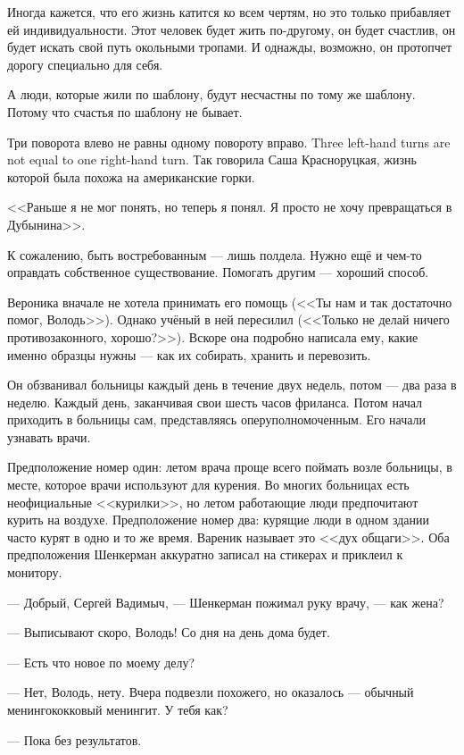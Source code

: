 Иногда кажется, что его жизнь катится ко всем чертям, но это только прибавляет ей индивидуальности.
Этот человек будет жить по-другому, он будет счастлив, он будет искать свой путь окольными тропами.
И однажды, возможно, он протопчет дорогу специально для себя.

А люди, которые жили по шаблону, будут несчастны по тому же шаблону.
Потому что счастья по шаблону не бывает.

{Три поворота влево не равны одному повороту вправо.}
{Three left-hand turns are not equal to one right-hand turn.}
Так говорила Саша Красноруцкая, жизнь которой была похожа на американские горки.

<<Раньше я не мог понять, но теперь я понял.
Я просто не хочу превращаться в Дубынина>>.

\textspace

К сожалению, быть востребованным --- лишь полдела.
Нужно ещё и чем-то оправдать собственное существование.
Помогать другим --- хороший способ.

Вероника вначале не хотела принимать его помощь (<<Ты нам и так достаточно помог, Володь>>).
Однако учёный в ней пересилил (<<Только не делай ничего противозаконного, хорошо?>>).
Вскоре она подробно написала ему, какие именно образцы нужны --- как их собирать, хранить и перевозить.

Он обзванивал больницы каждый день в течение двух недель, потом --- два раза в неделю.
Каждый день, заканчивая свои шесть часов фриланса.
Потом начал приходить в больницы сам, представляясь оперуполномоченным.
Его начали узнавать врачи.

Предположение номер один: летом врача проще всего поймать возле больницы, в месте, которое врачи используют для курения.
Во многих больницах есть неофициальные <<курилки>>, но летом работающие люди предпочитают курить на воздухе.
Предположение номер два: курящие люди в одном здании часто курят в одно и то же время.
Вареник называет это <<дух общаги>>.
Оба предположения Шенкерман аккуратно записал на стикерах и приклеил к монитору.

--- Добрый, Сергей Вадимыч, --- Шенкерман пожимал руку врачу, --- как жена?

--- Выписывают скоро, Володь!
Со дня на день дома будет.

--- Есть что новое по моему делу?

--- Нет, Володь, нету.
Вчера подвезли похожего, но оказалось --- обычный менингококковый менингит.
У тебя как?

--- Пока без результатов.

